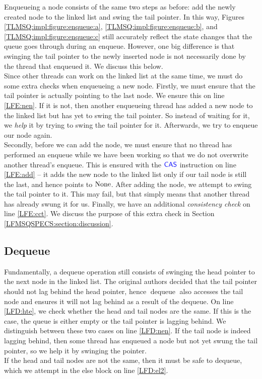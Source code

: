 \documentclass[a4paper, 10pt]{report}
\theoremstyle{definition}
\newcommand{\dequeue}{\operatorname{dequeue}}
\begin{document}
Enqueueing a node consists of the same two steps as before: add the newly created node to the linked list and swing the tail pointer. In this way, Figures \ref{TLMSQ:impl:figure:enqueue:a}, \ref{TLMSQ:impl:figure:enqueue:b}, and \ref{TLMSQ:impl:figure:enqueue:c} still accurately reflect the state changes that the queue goes through during an enqueue. However, one big difference is that swinging the tail pointer to the newly inserted node is not necessarily done by the thread that enqueued it. We discuss this below.\\
Since other threads can work on the linked list at the same time, we must do some extra checks when enqueueing a new node. Firstly, we must ensure that the tail pointer is actually pointing to the last node. We ensure this on line \ref{LFE:nen}. If it is not, then another enqueueing thread has added a new node to the linked list but has yet to swing the tail pointer. So instead of waiting for it, we \textit{help} it by trying to swing the tail pointer for it. Afterwards, we try to enqueue our node again.\\
Secondly, before we can add the node, we must ensure that no thread has performed an enqueue while we have been working so that we do not overwrite another thread's enqueue. This is ensured with the $\textsf{\color{blue} CAS}$ instruction on line \ref{LFE:add} -- it adds the new node to the linked list only if our tail node is still the last, and hence points to $\operatorname{None}$. After adding the node, we attempt to swing the tail pointer to it. This may fail, but that simply means that another thread has already swung it for us.
Finally, we have an additional \textit{consistency check} on line \ref{LFE:cct}. We discuss the purpose of this extra check in Section \ref{LFMSQSPECS:section:discussion}.

\subsection{Dequeue}
\label{LFMSQ:implementation:sub:dequeue}

Fundamentally, a dequeue operation still consists of swinging the head pointer to the next node in the linked list. The original authors decided that the tail pointer should not lag behind the head pointer, hence $\dequeue$ also accesses the tail node and ensures it will not lag behind as a result of the dequeue. On line \ref{LFD:hte}, we check whether the head and tail nodes are the same. If this is the case, the queue is either empty or the tail pointer is lagging behind. We distinguish between these two cases on line \ref{LFD:nen}. If the tail node is indeed lagging behind, then some thread has enqueued a node but not yet swung the tail pointer, so we help it by swinging the pointer.\\
If the head and tail nodes are not the same, then it must be safe to dequeue, which we attempt in the else block on line \ref{LFD:el2}.
\end{document}

